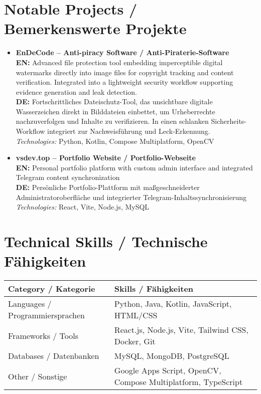 \documentclass[11pt,a4paper]{article}
\begin{document}
\section*{Notable Projects / Bemerkenswerte Projekte}
\begin{itemize}[leftmargin=*, itemsep=0.8em]
    \item \textbf{EnDeCode – Anti-piracy Software / Anti-Piraterie-Software}\\
    \textbf{EN:} Advanced file protection tool embedding imperceptible digital watermarks directly into image files for copyright tracking and content verification. Integrated into a lightweight security workflow supporting evidence generation and leak detection.\\
    \textbf{DE:} Fortschrittliches Dateischutz-Tool, das unsichtbare digitale Wasserzeichen direkt in Bilddateien einbettet, um Urheberrechte nachzuverfolgen und Inhalte zu verifizieren. In einen schlanken Sicherheits-Workflow integriert zur Nachweisführung und Leck-Erkennung.\\
    \textit{Technologies:} Python, Kotlin, Compose Multiplatform, OpenCV

    \item \textbf{vsdev.top – Portfolio Website / Portfolio-Webseite}\\
    \textbf{EN:} Personal portfolio platform with custom admin interface and integrated Telegram content synchronization\\
    \textbf{DE:} Persönliche Portfolio-Plattform mit maßgeschneiderter Administratoroberfläche und integrierter Telegram-Inhaltssynchronisierung\\
    \textit{Technologies:} React, Vite, Node.js, MySQL
\end{itemize}

\section*{Technical Skills / Technische Fähigkeiten}
\begin{tabularx}{\textwidth}{l X}
\toprule
\textbf{Category / Kategorie} & \textbf{Skills / Fähigkeiten} \\
\midrule
Languages / Programmiersprachen & Python, Java, Kotlin, JavaScript, HTML/CSS \\
\midrule
Frameworks / Tools & React.js, Node.js, Vite, Tailwind CSS, Docker, Git \\
\midrule
Databases / Datenbanken & MySQL, MongoDB, PostgreSQL \\
\midrule
Other / Sonstige & Google Apps Script, OpenCV, Compose Multiplatform, TypeScript \\
\bottomrule
\end{tabularx}
\end{document}
